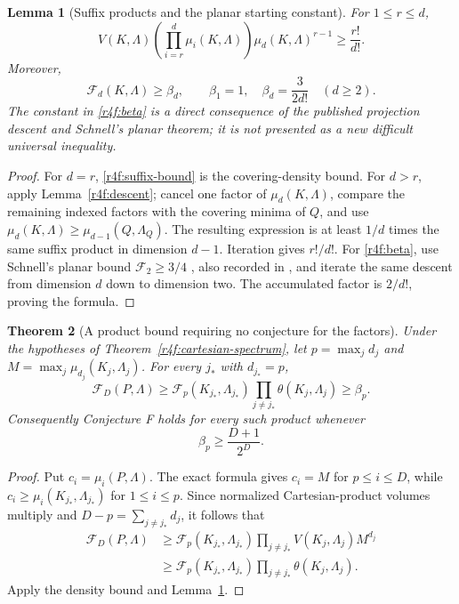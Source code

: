 \documentclass[11pt,a4paper]{article}
\newtheorem{theorem}{Theorem}[section]
\newtheorem{lemma}[theorem]{Lemma}
\theoremstyle{remark}\newtheorem{remark}[theorem]{Remark}
\begin{document}
\begin{lemma}[Suffix products and the planar starting constant]
\label{r4f:suffix}
For $1\le r\le d$,
\begin{equation}
\label{r4f:suffix-bound}
 V(K,\Lambda)\left(\prod_{i=r}^d\mu_i(K,\Lambda)\right)
                  \mu_d(K,\Lambda)^{r-1}\ge\frac{r!}{d!}.
\end{equation}
Moreover,
\begin{equation}
\label{r4f:beta}
 \mathcal F_d(K,\Lambda)\ge\beta_d,
 \qquad
 \beta_1=1,\quad\beta_d=\frac{3}{2d!}\quad(d\ge2).
\end{equation}
The constant in \eqref{r4f:beta} is a direct consequence of the
published projection descent and Schnell's planar theorem; it is not
presented as a new difficult universal inequality.
\end{lemma}

\begin{proof}
For $d=r$, \eqref{r4f:suffix-bound} is the covering-density bound.
For $d>r$, apply Lemma~\ref{r4f:descent}; cancel one factor of
$\mu_d(K,\Lambda)$, compare the remaining indexed factors with the
covering minima of $Q$, and use
$\mu_d(K,\Lambda)\ge\mu_{d-1}(Q,\Lambda_Q)$.
The resulting expression is at least $1/d$ times the same suffix
product in dimension $d-1$. Iteration gives $r!/d!$.
For \eqref{r4f:beta}, use Schnell's planar bound
$\mathcal F_2\ge3/4$ \cite{Schnell}, also recorded in \cite{GMS},
and iterate the same descent from dimension $d$ down to dimension two.
The accumulated factor is $2/d!$, proving the formula.
\end{proof}

\begin{theorem}[A product bound requiring no conjecture for the factors]
\label{r4f:unconditional-products}
Under the hypotheses of Theorem~\ref{r4f:cartesian-spectrum}, let
$p=\max_jd_j$ and $M=\max_j\mu_{d_j}(K_j,\Lambda_j)$.
For every $j_*$ with $d_{j_*}=p$,
\begin{equation}
\label{r4f:strong-product}
 \mathcal F_D(P,\Lambda)
 \ge\mathcal F_p(K_{j_*},\Lambda_{j_*})
       \prod_{j\ne j_*}\theta(K_j,\Lambda_j)
 \ge\beta_p.
\end{equation}
Consequently Conjecture F holds for every such product whenever
\begin{equation}
\label{r4f:threshold}
 \beta_p\ge\frac{D+1}{2^D}.
\end{equation}
\end{theorem}

\begin{proof}
Put $c_i=\mu_i(P,\Lambda)$. The exact formula gives $c_i=M$ for
$p\le i\le D$, while $c_i\ge\mu_i(K_{j_*},\Lambda_{j_*})$
for $1\le i\le p$. Since normalized Cartesian-product volumes
multiply and $D-p=\sum_{j\ne j_*}d_j$, it follows that
\begin{align*}
 \mathcal F_D(P,\Lambda)
 &\ge \mathcal F_p(K_{j_*},\Lambda_{j_*})
          \prod_{j\ne j_*} V(K_j,\Lambda_j)M^{d_j}\\
 &\ge \mathcal F_p(K_{j_*},\Lambda_{j_*})
          \prod_{j\ne j_*}\theta(K_j,\Lambda_j).
\end{align*}
Apply the density bound and Lemma~\ref{r4f:suffix}.
\end{proof}
\end{document}
